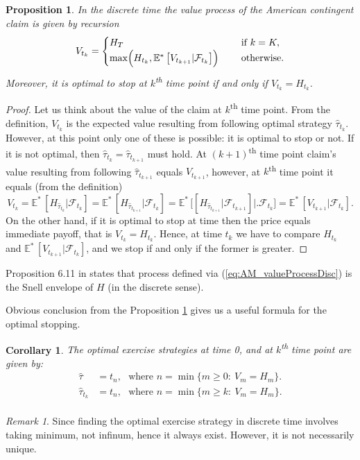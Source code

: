 \documentclass[a4paper,12pt, oneside]{book}
\newtheorem{prop}[thm]{Proposition}
\newtheorem{coro}[thm]{Corollary}
\theoremstyle{definition}
\theoremstyle{remark}
\newtheorem{remark}{Remark}[chapter]
\def\Em{{\mathbb{E}^*}\,}
\begin{document}
\begin{prop}
\label{prop:AM_valueProcessDisc}
 In the discrete time the value process of the American contingent claim is given by recursion
 \begin{equation}
  \label{eq:AM_valueProcessDisc}
  V_{t_k} = \begin{cases}
             H_T &\text{if } k = K,\\
             \max\Bigl(H_{t_k}, \Em\bigl[ V_{t_{k+1}} | \mathcal{F}_{t_k} \bigr] \Bigl)\ \ \ \ &\text{otherwise.}
            \end{cases}
 \end{equation}
 Moreover, it is optimal to stop at $k$\textsuperscript{th} time point if and only if $V_{t_k} = H_{t_k}$. 
\end{prop}
\begin{proof}
Let us think about the value of the claim at $k$\textsuperscript{th} time point. From the definition, $V_{t_k}$ is the expected value resulting from following optimal strategy $\hat{\tau}_{t_k}$. However, at this point only one of these is possible: it is optimal to stop or not. If it is not optimal, then $\hat{\tau}_{t_k} = \hat{\tau}_{t_{k+1}}$ must hold. At $(k+1)$\textsuperscript{th} time point claim's value resulting from following $\hat{\tau}_{t_{k+1}}$ equals $V_{t_{k+1}}$, however, at $k$\textsuperscript{th} time point it equals (from the definition) 
\[ V_{t_k} = \Em[H_{\hat{\tau}_{t_k}} | \mathcal{F}_{t_k}] = \Em[H_{\hat{\tau}_{t_{k+1}}} | \mathcal{F}_{t_k}] = \Em\bigl[[H_{\hat{\tau}_{t_{k+1}}} | \mathcal{F}_{t_{k+1}}] \bigl|\bigr. \mathcal{F}_{t_k} \bigr] = \Em[V_{t_{k+1}} | \mathcal{F}_{t_k}].\]
On the other hand, if it is optimal to stop at time then the price equals immediate payoff, that is $V_{t_k} = H_{t_k}$. Hence, at time $t_k$ we have to compare $H_{t_k}$ and $\Em[V_{t_{k+1}} | \mathcal{F}_{t_k}]$, and we stop if and only if the former is greater.
\end{proof}
Proposition 6.11 in \cite{follmer} states that process defined via (\ref{eq:AM_valueProcessDisc}) is the Snell envelope of $H$ (in the discrete sense).

Obvious conclusion from the Proposition \ref{prop:AM_valueProcessDisc} gives us a useful formula for the optimal stopping.
\begin{coro}
 \label{coro:AM_optStopDisc}
 The optimal exercise strategies at time 0, and at $k$\textsuperscript{th} time point are given by:
 \begin{equation}
  \label{eq:AM_optStopDisc}
  \begin{split}
   \hat{\tau} &= t_n,\ \ \ \text{where } n = \min\{m \geq 0:\ V_m = H_m \}.\\
   \hat{\tau}_{t_k} &= t_n,\ \ \ \text{where } n = \min\{m \geq k:\ V_m = H_m \}.\\
  \end{split}
 \end{equation}
\end{coro}
\begin{remark}
 Since finding the optimal exercise strategy in discrete time involves taking minimum, not infinum, hence it always exist. However, it is not necessarily unique.
\end{remark}
\end{document}
